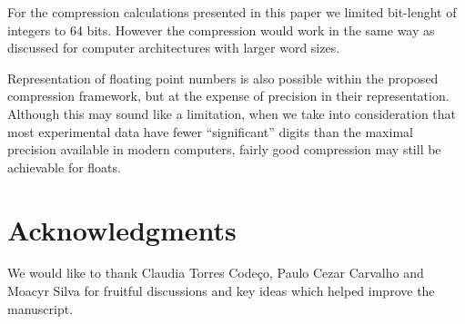 \documentclass[10pt]{article}
\begin{document}
For the compression calculations presented in this paper we limited bit-lenght of integers to 64 bits. However the compression would work in the same way as discussed for computer architectures with larger word sizes.

Representation of floating point numbers is also possible within the proposed compression framework, but at the expense of precision in their representation. Although this may sound like a limitation, when we take into consideration that most experimental data have fewer ``significant'' digits than the maximal precision available in modern computers, fairly good compression may still be achievable for floats.




\section*{Acknowledgments}
We would like to thank Claudia Torres Code\c{c}o, Paulo Cezar Carvalho and Moacyr Silva for fruitful discussions and key ideas which helped improve the manuscript.


\end{document}
